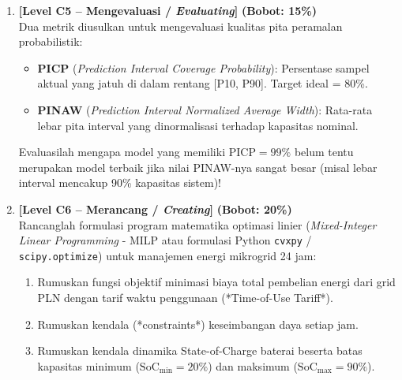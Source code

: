 \documentclass[11pt,a4paper]{article}
\begin{document}
\begin{enumerate}[leftmargin=1.5em, label=\textbf{Soal \arabic*.}]
    \vspace{0.4cm}

    \item \textbf{[Level C5 -- Mengevaluasi / \textit{Evaluating}]} \hfill \textbf{(Bobot: 15\%)} \\
    Dua metrik diusulkan untuk mengevaluasi kualitas pita peramalan probabilistik:
    \begin{itemize}
        \item \textbf{PICP} (\textit{Prediction Interval Coverage Probability}): Persentase sampel aktual yang jatuh di dalam rentang [P10, P90]. Target ideal = 80\%.
        \item \textbf{PINAW} (\textit{Prediction Interval Normalized Average Width}): Rata-rata lebar pita interval yang dinormalisasi terhadap kapasitas nominal.
    \end{itemize}
    Evaluasilah mengapa model yang memiliki $\text{PICP} = 99\%$ belum tentu merupakan model terbaik jika nilai PINAW-nya sangat besar (misal lebar interval mencakup 90\% kapasitas sistem)!

    \vspace{0.4cm}

    \item \textbf{[Level C6 -- Merancang / \textit{Creating}]} \hfill \textbf{(Bobot: 20\%)} \\
    Rancanglah formulasi program matematika optimasi linier (\textit{Mixed-Integer Linear Programming} - MILP atau formulasi Python \texttt{cvxpy} / \texttt{scipy.optimize}) untuk manajemen energi mikrogrid 24 jam:
    \begin{enumerate}[label=\alph*.]
        \item Rumuskan fungsi objektif minimasi biaya total pembelian energi dari grid PLN dengan tarif waktu penggunaan (*Time-of-Use Tariff*).
        \item Rumuskan kendala (*constraints*) keseimbangan daya setiap jam.
        \item Rumuskan kendala dinamika State-of-Charge baterai beserta batas kapasitas minimum ($\text{SoC}_{\min} = 20\%$) dan maksimum ($\text{SoC}_{\max} = 90\%$).
    \end{enumerate}

\end{enumerate}
\end{document}
